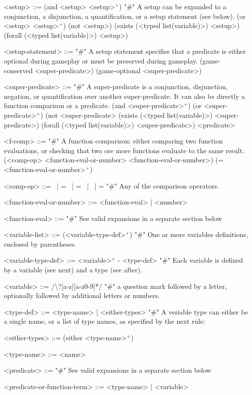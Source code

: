 \documentclass{article}
\begin{document}
\begin{grammar}
<setup> ::= (and <setup> <setup>$^+$) "#" A setup can be expanded to a conjunction, a disjunction, a quantification, or a setup statement (see below).
    \alt (or <setup> <setup>$^+$) 
    \alt (not <setup>)
    \alt (exists (<typed list(variable)>) <setup>)
    \alt (forall (<typed list(variable)>) <setup>) 

<setup-statement> ::= "#" A setup statement specifies that a predicate is either optional during gameplay or must be preserved during gameplay.
    \alt (game-conserved <super-predicate>) 
    \alt (game-optional <super-predicate>)

<super-predicate> ::= "#" A super-predicate is a conjunction, disjunction, negation, or quantification over another super-predicate. It can also be directly a function comparison or a predicate.
    \alt (and <super-predicate>$^+$) 
    \alt (or <super-predicate>$^+$) 
    \alt (not <super-predicate> 
    \alt (exists (<typed list(variable)>) <super-predicate>) 
    \alt (forall (<typed list(variable)>) <super-predicate>) 
    \alt <predicate>


<f-comp> ::= "#" A function comparison: either comparing two function evaluations, or checking that two ore more functions evaluate to the same result.
    \alt (<comp-op> <function-eval-or-number> <function-eval-or-number>) 
    \alt (= <function-eval-or-number>$^+$)
    
<comp-op> ::=  \textlangle \ | \textlangle = \ | = \ | \textrangle \ | \textrangle = "#" Any of the comparison operators.

<function-eval-or-number> ::= <function-eval> | <number> 

<function-eval> ::= "#" See valid expansions in a separate section below


<variable-list> ::= (<variable-type-def>$^+$) "#" One or more variables definitions, enclosed by parentheses.

<variable-type-def> ::= <variable>$^+$ - <type-def> "#" Each variable is defined by a variable (see next) and a type (see after).

<variable> ::= /\textbackslash?[a-z][a-z0-9]*/  "#" a question mark followed by a letter, optionally followed by additional letters or numbers.

<type-def> ::= <type-name> | <either-types> "#" A veriable type can either be a single name, or a list of type names, as specified by the next rule:

<either-types> ::= (either <type-name>$^+$)

<type-name> ::= <name>

<predicate> ::= "#" See valid expansions in a separate section below

<predicate-or-function-term> ::= <type-name> | <variable>


\end{grammar}
\end{document}
